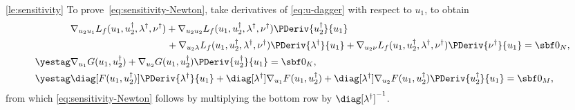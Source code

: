 \documentclass[11pt]{article}
\begin{document}
\begin{proof-lemma}{\ref{le:sensitivity}}
  To prove~\ref{eq:sensitivity-Newton}, take derivatives of
  \eqref{eq:u-dagger} with respect to $u_1$, to obtain
  \begin{align*}
    &\nabla_{u_2u_1} L_f(u_1,u_2^\dagger,\lambda^\dagger,\nu^\dagger)
    +\nabla_{u_2u_2} L_f(u_1,u_2^\dagger,\lambda^\dagger,\nu^\dagger)\PDeriv{u_2^\dagger}{u_1}\\&\hspace*{10em}
    +\nabla_{u_2\lambda} L_f(u_1,u_2^\dagger,\lambda^\dagger,\nu^\dagger)\PDeriv{\lambda^\dagger}{u_1}
    +\nabla_{u_2\nu} L_f(u_1,u_2^\dagger,\lambda^\dagger,\nu^\dagger)\PDeriv{\nu^\dagger}{u_1}
    =\sbf 0_{N}, \\
    \yestag\label{eq:G-dagger}
    &\nabla_{u_1} G(u_1,u_2^\dagger)+\nabla_{u_2} G(u_1,u_2^\dagger)\PDeriv{u_2^\dagger}{u_1}
    =\sbf 0_{K}, \\
    \yestag\label{eq:F-dagger}
    &
    \diag[F(u_1,u_2^\dagger)]\PDeriv{\lambda^\dagger}{u_1}
    +
    \diag[\lambda^\dagger] \nabla_{u_1} F(u_1,u_2^\dagger)
    +\diag[\lambda^\dagger] \nabla_{u_2} F(u_1,u_2^\dagger)\PDeriv{u_2^\dagger}{u_1}
    =\sbf 0_{M},
  \end{align*}
  from which \eqref{eq:sensitivity-Newton} follows by multiplying the
  bottom row by $\diag[\lambda^\dagger]^{-1}$.

  \medskip


\end{proof-lemma}
\end{document}
